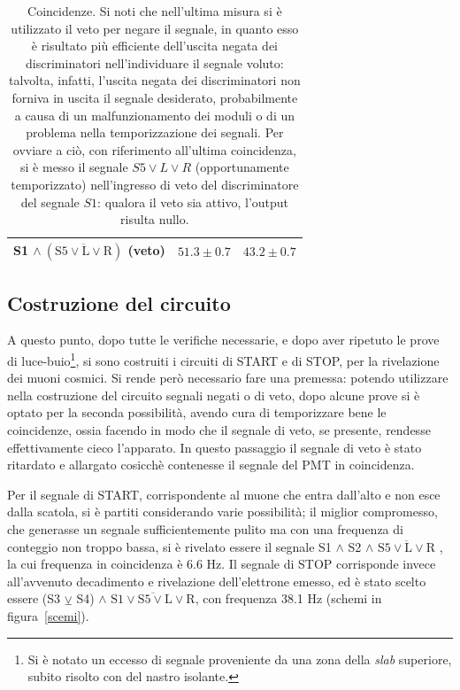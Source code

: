 \documentclass[10pt, oneside, a4paper]{article}   	%
\begin{document}
\begin{table}[H]
\begin{tabular}{ccc}
		S1 $\wedge \ (\overline{\mbox{S5}\vee \mbox{L} \vee \mbox{R}})$ (veto)	& $51.3 \pm 0.7$	& $43.2 \pm 0.7$	\\
		\bottomrule
	\end{tabular}
	\caption{Coincidenze. 
	Si noti che nell'ultima misura si è utilizzato il veto per negare il segnale, 
	in quanto esso è risultato più efficiente dell'uscita negata dei discriminatori 
	nell'individuare il segnale voluto: talvolta, infatti, l'uscita negata dei discriminatori non forniva in uscita il segnale desiderato, 
	probabilmente a causa di un malfunzionamento dei moduli o di un problema nella temporizzazione dei segnali. Per ovviare a ciò, con riferimento all'ultima coincidenza,
	si è messo il segnale $S5\vee L\vee R$ (opportunamente temporizzato)
	nell'ingresso di veto del discriminatore del 
	segnale $S1$: qualora il veto sia attivo, l'output 
	risulta nullo.}
	\label{coincidenze}
\end{table}
%
\subsection{Costruzione del circuito}
A questo punto, dopo tutte le verifiche necessarie, e dopo aver ripetuto le prove di luce-buio\footnote{Si è notato un eccesso di segnale proveniente da una zona della \emph{slab} superiore, subito risolto con del nastro isolante.}, si sono costruiti i circuiti di START e di STOP, per la rivelazione dei muoni cosmici. Si rende però necessario fare una premessa: potendo utilizzare nella costruzione del circuito segnali negati o di veto, dopo alcune prove si è optato per la seconda possibilità, avendo cura di temporizzare bene le coincidenze, ossia facendo in modo che il segnale di veto, se presente, rendesse effettivamente cieco l'apparato. In questo passaggio il segnale di veto è stato ritardato e allargato cosicchè contenesse il segnale del PMT in coincidenza.

Per il segnale di START, corrispondente al muone che entra dall'alto e non esce dalla scatola, si è partiti considerando varie possibilità; il miglior compromesso, che generasse un segnale sufficientemente pulito ma con una frequenza di conteggio non troppo bassa, si è rivelato essere il segnale S1 $\wedge$ S2  $\wedge$ $\overline{\mbox{S5}\vee \mbox{L} \vee \mbox{R}}$ , la cui frequenza in coincidenza è 6.6 Hz.
Il segnale di STOP corrisponde invece all'avvenuto decadimento e rivelazione dell'elettrone emesso, ed è stato scelto essere (S3 $\veebar$ S4)  $\wedge$ $\overline{\mbox{S1} \vee \mbox{S5}\vee \mbox{L} \vee \mbox{R}}$, con frequenza 38.1 Hz (schemi in figura~\ref{scemi}).
\end{document}
